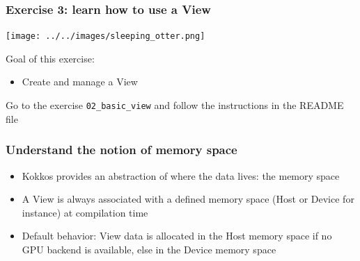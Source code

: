\documentclass[aspectratio=169]{beamer}
\begin{document}


\begin{frame}[fragile]
    \frametitle{Exercise 3: learn how to use a View} 

    \begin{center}
    \texttt{[image: ../../images/sleeping\_otter.png]}
    \end{center}

    Goal of this exercise:

    \begin{itemize}
        \item Create and manage a View
    \end{itemize}

    \begin{block}{}
        Go to the exercise \texttt{02\_basic\_view} and follow the instructions in the README file
    \end{block}

\end{frame}


\begin{frame}[fragile]
    \frametitle{Understand the notion of memory space}

\begin{itemize}
    \item Kokkos provides an abstraction of where the data lives: the memory space
    \item A View is always associated with a defined memory space (Host or Device for instance) at compilation time
    \item Default behavior: View data is allocated in the Host memory space if no GPU backend is available, else in the Device memory space
\end{itemize}
\end{frame}

\end{document}
